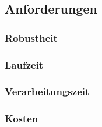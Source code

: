 \subsection{Anforderungen}
\subsubsection{Robustheit}
\subsubsection{Laufzeit}
\subsubsection{Verarbeitungszeit}
\subsubsection{Kosten}